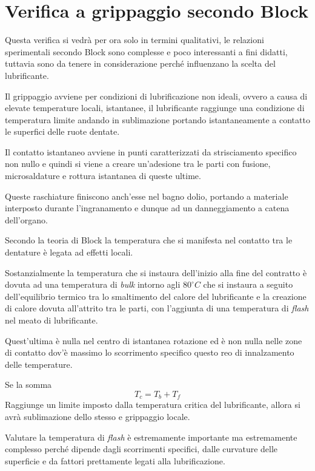 \documentclass[a4paper, 15pt]{article}
\begin{document}
\section{Verifica a grippaggio secondo Block}
\begin{adjustwidth}{2in}{}	
	Questa verifica si vedrà per ora solo in termini qualitativi, le relazioni sperimentali secondo Block sono complesse e poco interessanti a fini didatti, tuttavia sono da tenere in considerazione perché influenzano la scelta del lubrificante. \newline 
	
	Il grippaggio avviene per condizioni di lubrificazione non ideali, ovvero a causa di elevate temperature locali, istantanee, il lubrificante raggiunge  una condizione di temperatura limite andando in sublimazione portando istantaneamente a contatto le superfici delle ruote dentate.
	
	Il contatto istantaneo avviene in punti caratterizzati da  strisciamento specifico non nullo e quindi si viene a creare un'adesione tra le parti con fusione, microsaldature e rottura istantanea di queste ultime. \newline 
	
	Queste raschiature finiscono anch'esse nel bagno dolio, portando a materiale interposto durante l'ingranamento e dunque ad un danneggiamento a catena dell'organo. \newline 
	
	Secondo la teoria di Block la temperatura che si manifesta nel contatto tra le dentature è legata ad effetti locali. 
	
	Sostanzialmente la temperatura che si instaura dell'inizio alla fine del contratto è dovuta ad una temperatura di \textit{bulk} intorno agli $80^\circ C$ che si instaura  a seguito dell'equilibrio termico tra lo smaltimento del calore del lubrificante e la creazione di calore dovuta all'attrito tra le parti, con l'aggiunta di una temperatura di \textit{flash} nel meato di lubrificante. 
	
	Quest'ultima è nulla nel centro di istantanea rotazione ed è non nulla nelle zone di contatto dov'è massimo lo scorrimento specifico questo reo di innalzamento delle temperature. 
	
	Se la somma 
	\[T_c = T_b+T_f\]
	Raggiunge un limite imposto dalla temperatura critica del lubrificante, allora si avrà sublimazione dello stesso e grippaggio locale. \newline 
	
	Valutare la temperatura di \textit{flash} è estremamente importante ma estremamente complesso perché dipende dagli scorrimenti specifici, dalle curvature delle superficie e da fattori prettamente legati alla lubrificazione. 
	

\end{adjustwidth}
\end{document}
